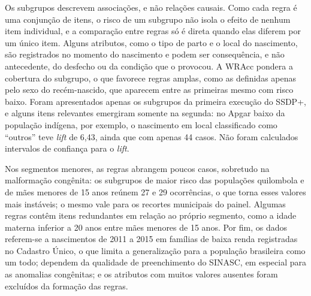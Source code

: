 Os subgrupos descrevem associações, e não relações causais. Como cada regra é uma conjunção de itens, o risco de um subgrupo não isola o efeito de nenhum item individual, e a comparação entre regras só é direta quando elas diferem por um único item. Alguns atributos, como o tipo de parto e o local do nascimento, são registrados no momento do nascimento e podem ser consequência, e não antecedente, do desfecho ou da condição que o provocou. A WRAcc pondera a cobertura do subgrupo, o que favorece regras amplas, como as definidas apenas pelo sexo do recém-nascido, que aparecem entre as primeiras mesmo com risco baixo. Foram apresentados apenas os subgrupos da primeira execução do SSDP+, e alguns itens relevantes emergiram somente na segunda: no Apgar baixo da população indígena, por exemplo, o nascimento em local classificado como ``outros'' teve \emph{lift} de 6,43, ainda que com apenas 44 casos. Não foram calculados intervalos de confiança para o \emph{lift}.

Nos segmentos menores, as regras abrangem poucos casos, sobretudo na malformação congênita: os subgrupos de maior risco das populações quilombola e de mães menores de 15 anos reúnem 27 e 29 ocorrências, o que torna esses valores mais instáveis; o mesmo vale para os recortes municipais do painel. Algumas regras contêm itens redundantes em relação ao próprio segmento, como a idade materna inferior a 20 anos entre mães menores de 15 anos. Por fim, os dados referem-se a nascimentos de 2011 a 2015 em famílias de baixa renda registradas no Cadastro Único, o que limita a generalização para a população brasileira como um todo; dependem da qualidade de preenchimento do SINASC, em especial para as anomalias congênitas; e os atributos com muitos valores ausentes foram excluídos da formação das regras.
